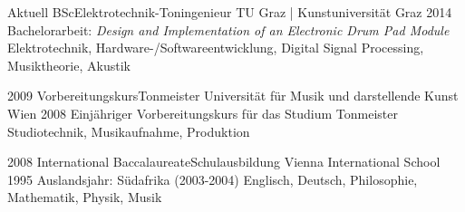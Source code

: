 %
%


\begin{experiences}
	\experience
	{Aktuell}
	{BSc}{Elektrotechnik-Toningenieur}
	{TU Graz | Kunstuniversität Graz}
	{2014}
	{
		Bachelorarbeit:
		\textit{Design and Implementation of an Electronic Drum Pad Module}
	}
	{
		Elektrotechnik,
		Hardware-/Softwareentwicklung,
		Digital Signal Processing,
		Musiktheorie,
		Akustik
	}
	
	\emptySeparator
	
	\experience
	{2009}
	{Vorbereitungskurs}{Tonmeister}
	{Universität für Musik und darstellende Kunst Wien}
	{2008}
	{
		Einjähriger Vorbereitungskurs für das Studium Tonmeister
	}
	{
		Studiotechnik,
		Musikaufnahme,
		Produktion
	}
	
	\emptySeparator
	
	\experience
	{2008}
	{International Baccalaureate}{Schulausbildung}
	{Vienna International School}
	{1995}
	{
		Auslandsjahr: Südafrika (2003-2004)
	}
	{
		Englisch,
		Deutsch,
		Philosophie,
		Mathematik,
		Physik,
		Musik
	}
\end{experiences}
